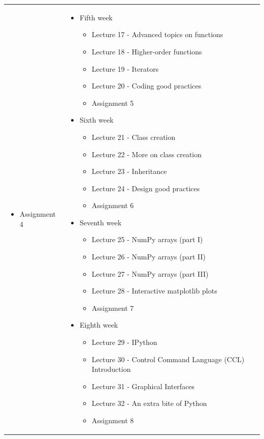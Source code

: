\documentclass[letter, 10pt]{article}
\begin{document}
\begin{footnotesize}
\begin{tabular}{p{}p{}}
\begin{itemize}
\begin{itemize}
        \item Assignment 4
    \end{itemize}
\end{itemize}
&
\begin{itemize}
    \item Fifth week
    \begin{itemize}
        \item Lecture 17 - Advanced topics on functions
        \item Lecture 18 - Higher-order functions
        \item Lecture 19 - Iterators
        \item Lecture 20 - Coding good practices
        \item Assignment 5
    \end{itemize}
    \item Sixth week
    \begin{itemize}
        \item Lecture 21 - Class creation
        \item Lecture 22 - More on class creation
        \item Lecture 23 - Inheritance
        \item Lecture 24 - Design good practices
        \item Assignment 6
    \end{itemize}
    \item Seventh week
    \begin{itemize}
        \item Lecture 25 - NumPy arrays (part I)
        \item Lecture 26 - NumPy arrays (part II)
        \item Lecture 27 - NumPy arrays (part III)
        \item Lecture 28 - Interactive matplotlib plots
        \item Assignment 7
    \end{itemize}
    \item Eighth week
    \begin{itemize}
        \item Lecture 29 - IPython
        \item Lecture 30 - Control Command Language (CCL) Introduction
        \item Lecture 31 - Graphical Interfaces
        \item Lecture 32 - An extra bite of Python
        \item Assignment 8
    \end{itemize}
\end{itemize}
\\
\end{tabular}
\end{footnotesize}
\end{document}
